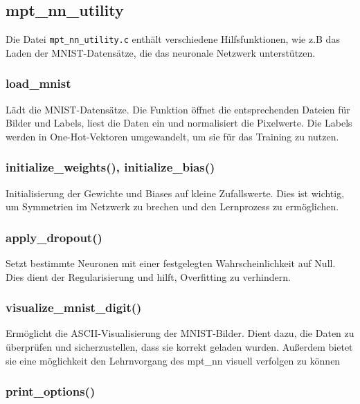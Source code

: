 \documentclass[a4paper, 12pt]{article}
\begin{document}
\subsection{mpt\_nn\_utility}
\label{subsec:mpt_nn_utility}

Die Datei \texttt{mpt\_nn\_utility.c} enthält verschiedene Hilfsfunktionen, wie z.B das Laden der MNIST-Datensätze, die das neuronale Netzwerk unterstützen.


\subsubsection{load\_mnist}

Lädt die MNIST-Datensätze. 
Die Funktion öffnet die entsprechenden Dateien für Bilder und Labels, liest die Daten ein und normalisiert die Pixelwerte. 
Die Labels werden in One-Hot-Vektoren umgewandelt, um sie für das Training zu nutzen.

\subsubsection{initialize\_weights(), initialize\_bias()}

Initialisierung der Gewichte und Biases auf kleine Zufallswerte. 
Dies ist wichtig, um Symmetrien im Netzwerk zu brechen und den Lernprozess zu ermöglichen.

\subsubsection{apply\_dropout()}

Setzt bestimmte Neuronen mit einer festgelegten Wahrscheinlichkeit auf Null. 
Dies dient der Regularisierung und hilft, Overfitting zu verhindern.

\subsubsection{visualize\_mnist\_digit()}

Ermöglicht die ASCII-Visualisierung der MNIST-Bilder. 
Dient dazu, die Daten zu überprüfen und sicherzustellen, dass sie korrekt geladen wurden.
Außerdem bietet sie eine möglichkeit den Lehrnvorgang des mpt\_nn visuell verfolgen zu können 

\subsubsection{print\_options()}
\end{document}
